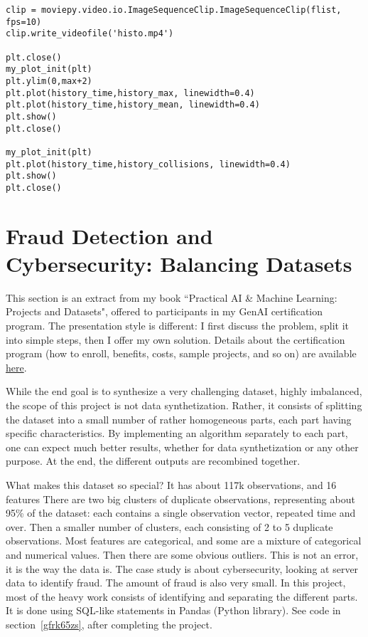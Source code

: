 \documentclass[oneside,10pt]{book}
\begin{document}
\begin{lstlisting}
clip = moviepy.video.io.ImageSequenceClip.ImageSequenceClip(flist, fps=10)
clip.write_videofile('histo.mp4')
    
plt.close()
my_plot_init(plt)
plt.ylim(0,max+2)
plt.plot(history_time,history_max, linewidth=0.4)
plt.plot(history_time,history_mean, linewidth=0.4)
plt.show()
plt.close()

my_plot_init(plt)
plt.plot(history_time,history_collisions, linewidth=0.4)
plt.show()
plt.close()
\end{lstlisting}



\section{Fraud Detection and Cybersecurity: Balancing Datasets}\label{g0n2fd}

This section is an extract from my book ``Practical AI \& Machine Learning: Projects and Datasets", offered to participants in my GenAI
 certification program. The presentation style is different: I first discuss the problem, split it into simple steps, then I offer my own solution. 
Details about the certification program (how to enroll, benefits, costs, sample projects, and so on) are available \href{https://mltblog.com/3pWxvZK}{here}.

While the end goal is to synthesize a very challenging dataset, highly imbalanced, the scope of this project is not data synthetization.
 Rather, it consists of splitting the dataset into a small number of rather homogeneous parts, each part having specific characteristics. 
 By implementing an  algorithm separately to each part, one can expect much better results, whether for data synthetization or any other purpose. At the end, the different outputs are recombined together.

What makes this dataset so special? It has about 117k observations, and 16 features There are two big clusters of duplicate observations, representing 
about 95\% of the dataset: each contains a single observation vector, repeated time and over.  Then a smaller number of clusters, each consisting of 2 to 5 duplicate observations. 
Most features are categorical, and some are a mixture of categorical and numerical values. Then there are some obvious outliers.
This is not an error, it is the way the data is. The case study is about cybersecurity, looking at server data to identify fraud. The amount of fraud is also very small. In this project, most of the heavy work consists of identifying and separating the different parts.
 It is done using SQL-like statements in \textcolor{index}{Pandas} (Python library). See code in section~\ref{gfrk65zs},
 after completing the project.
\end{document}
